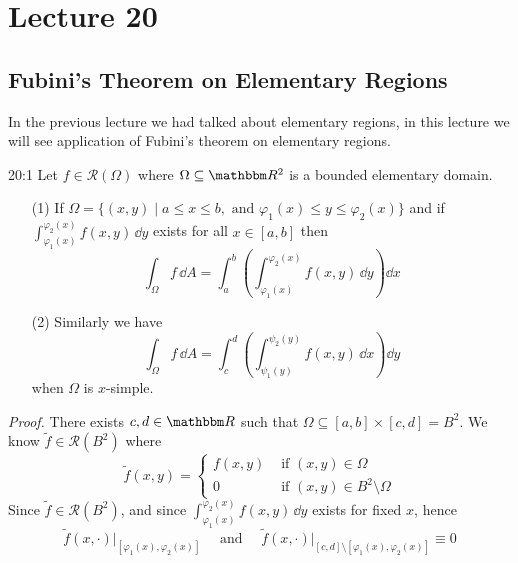 \documentclass[../Analysis-3]{subfiles}
\begin{document}
\chapter*{Lecture 20} %
\setcounter{chapter}{20} %
\setcounter{section}{0}

\section{Fubini's Theorem on Elementary Regions}

In the previous lecture we had talked about elementary regions, in this lecture we will see application of Fubini's theorem on elementary regions.

\begin{Thm}{}{20:1}
    Let $f \in \mathscr{R}(\Omega)$ where $\Omega \subseteq \R^2$ is a bounded elementary domain.
    \begin{enumerate}
        \item[(1)] If $\Omega = \{ (x,y) \mid a \leq x \leq b, \mbox{ and } \varphi_1(x) \leq y \leq \varphi_2(x) \}$ and if $\displaystyle{\int_{\varphi_1(x)}^{\varphi_2(x)}f(x,y) \, \dd
                    y}$ exists for all $x \in [a,b]$ then
            \[
                \int_{\Omega} f \, \dd A = \int_a^b \left( \int_{\varphi_1(x)}^{\varphi_2(x)} f(x,y) \, \dd y\right) \dd x
            \]

        \item[(2)] Similarly we have
            \[
                \int_{\Omega} f \, \dd A = \int_c^d \left( \int_{\psi_1(y)}^{\psi_2(y)} f(x,y) \, \dd x\right) \dd y
            \]
            when $\Omega$ is $x$-simple.
    \end{enumerate}
\end{Thm}
\textit{Proof.} There exists $c,d \in \R$ such that $\Omega \subseteq [a,b] \times [c,d] = B^2$. We know $\tilde{f} \in \mathscr{R}(B^2)$ where
\[
    \tilde{f}(x,y) = \begin{cases}
        f(x,y) & \mbox{ if } (x,y) \in \Omega               \\
        0      & \mbox{ if } (x,y) \in B^2 \setminus \Omega
    \end{cases}
\]
Since $\tilde{f} \in \mathscr{R}(B^2)$, and since $\displaystyle{\int_{\varphi_1(x)}^{\varphi_2(x)} f(x,y) \, \dd y}$ exists for fixed $x$, hence
\[
    \tilde{f}(x,\cdot)\big\vert_{[\varphi_1(x),\varphi_2(x)]} \quad \mbox{ and } \quad \tilde{f}(x,\cdot)\big\vert_{[c,d]\setminus[\varphi_1(x),\varphi_2(x)]} \equiv 0
\]
\end{document}
